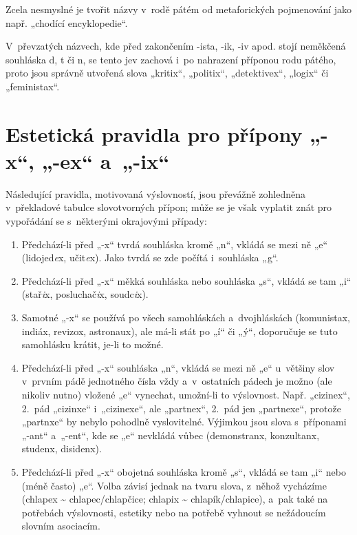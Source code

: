 Zcela nesmyslné je tvořit názvy v rodě pátém od metaforických pojmenování
jako např. „chodící encyklopedie“.


V převzatých názvech, kde před zakončením -ista, -ik, -iv apod. stojí
neměkčená souhláska d, t či n, se tento jev zachová i po nahrazení
příponou rodu pátého, proto jsou správně utvořená slova
„kritix“, „politix“, „detektivex“, „logix“ či „feministax“.


\section{Estetická pravidla pro přípony „-x“, „-ex“ a „-ix“}

Následující pravidla, motivovaná výslovností, jsou převážně zohledněna v překladové tabulce
slovotvorných přípon; může se je však vyplatit znát pro vypořádání se
s některými okrajovými případy:

\begin{enumerate}
\item Předchází-li před „-x“ tvrdá souhláska kromě „n“, vkládá se mezi ně „e“
(lidojed\emph{e}x, učit\emph{e}x). Jako tvrdá se zde počítá i souhláska „g“.
\item Předchází-li před „-x“ měkká souhláska nebo souhláska „s“,
vkládá se tam „i“ (stař\emph{i}x, posluchač\emph{i}x, soudc\emph{i}x).
\item Samotné „-x“ se používá po všech samohláskách a dvojhláskách
(komunistax, indiáx, revizox, astronaux), ale má-li stát po „í“ či „ý“,
doporučuje se tuto samohlásku krátit, je-li to možné.
\item Předchází-li před „-x“ souhláska „n“, vkládá se mezi ně „e“
u většiny slov v prvním pádě jednotného čísla vždy a v ostatních pádech
je možno (ale nikoliv nutno) vložené „e“ vynechat, umožní-li to výslovnost.
Např. „cizinex“, 2. pád „cizinxe“ i „cizinexe“, ale „partnex“, 2. pád
jen „partnexe“, protože „partnxe“ by nebylo pohodlně vyslovitelné.
Výjimkou jsou slova s příponami „-ant“ a „-ent“, kde se „e“ nevkládá vůbec
(demonstranx, konzultanx, studenx, disidenx).
\item Předchází-li před „-x“ obojetná souhláska kromě „s“, vkládá se tam „i“
nebo (méně často) „e“. Volba závisí jednak na tvaru slova, z něhož vycházíme
(chlapex \textasciitilde{} chlapec/chlapčice; chlapix \textasciitilde{} chlapík/chlapice),
a pak také na potřebách výslovnosti, estetiky nebo na potřebě vyhnout se
nežádoucím slovním asociacím.
\end{enumerate}

